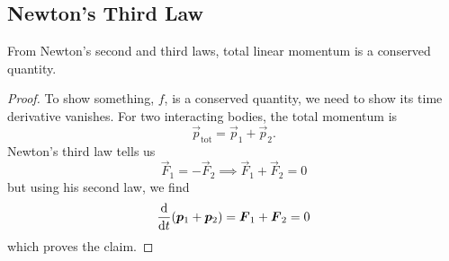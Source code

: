 \subsection{Newton's Third Law}
\begin{corollary}
From Newton's second and third laws, total linear momentum
is a conserved quantity.
\end{corollary}
\begin{proof}
To show something, $f$, is a conserved quantity, we
need to show its time derivative vanishes. For two interacting
bodies, the total momentum is
\begin{equation}
    \vec{p}_{\text{tot}} = \vec{p}_{1} + \vec{p}_{2}.
\end{equation}
Newton's third law tells us
\begin{equation}
    \vec{F}_{1}=-\vec{F}_{2}\implies\vec{F}_{1}+\vec{F}_{2}=0
\end{equation}
but using his second law, we find
\begin{equation}
    \frac{\D}{\D t}(\vec{p}_{1} + \vec{p}_{2}) =\vec{F}_{1}+\vec{F}_{2}=0
\end{equation}
which proves the claim.
\end{proof}